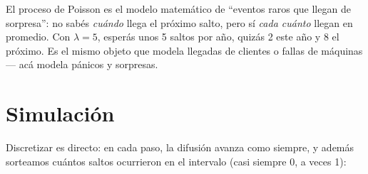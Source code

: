 \documentclass[
  spanish,
  letterpaper,
  DIV=11,
  numbers=noendperiod]{scrreprt}
\begin{document}
\begin{tcolorbox}[enhanced jigsaw, bottomrule=.15mm, colback=white, opacitybacktitle=0.6, arc=.35mm, toprule=.15mm, opacityback=0, breakable, titlerule=0mm, left=2mm, coltitle=black, colbacktitle=quarto-callout-tip-color!10!white, colframe=quarto-callout-tip-color-frame, leftrule=.75mm, toptitle=1mm, bottomtitle=1mm, title=\textcolor{quarto-callout-tip-color}{\faLightbulb}\hspace{0.5em}{La intuición del Poisson}, rightrule=.15mm]

El proceso de Poisson es el modelo matemático de ``eventos raros que
llegan de sorpresa'': no sabés \emph{cuándo} llega el próximo salto,
pero sí \emph{cada cuánto} llegan en promedio. Con \(\lambda = 5\),
esperás unos 5 saltos por año, quizás 2 este año y 8 el próximo. Es el
mismo objeto que modela llegadas de clientes o fallas de máquinas ---
acá modela pánicos y sorpresas.

\end{tcolorbox}

\section{Simulación}\label{simulaciuxf3n}

Discretizar es directo: en cada paso, la difusión avanza como siempre, y
además sorteamos cuántos saltos ocurrieron en el intervalo (casi siempre
0, a veces 1):
\end{document}
